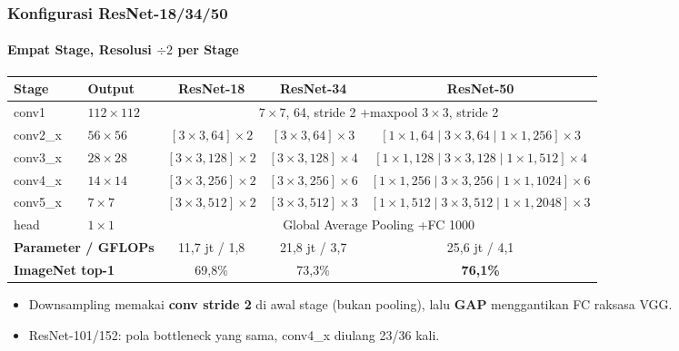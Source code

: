 \documentclass[t,aspectratio=169,xcolor=dvipsnames]{beamer}
\begin{document}
\begin{frame}
    \frametitle{Konfigurasi ResNet-18/34/50}
    \framesubtitle{Empat Stage, Resolusi $\div2$ per Stage}
    \scriptsize
    \vspace{4pt}
    \begin{center}
    \begin{tabular}{llccc}
        \toprule
        \textbf{Stage} & \textbf{Output} & \textbf{ResNet-18} & \textbf{ResNet-34} & \textbf{ResNet-50} \\
        \midrule
        conv1 & $112\times112$ & \multicolumn{3}{c}{$7\times7$, 64, stride 2 \quad+\quad maxpool $3\times3$, stride 2} \\
        conv2\_x & $56\times56$ & $[3\times3, 64]\times2$ & $[3\times3, 64]\times3$ & $[1{\times}1,64 \mid 3{\times}3,64 \mid 1{\times}1,256]\times3$ \\
        conv3\_x & $28\times28$ & $[3\times3, 128]\times2$ & $[3\times3, 128]\times4$ & $[1{\times}1,128 \mid 3{\times}3,128 \mid 1{\times}1,512]\times4$ \\
        conv4\_x & $14\times14$ & $[3\times3, 256]\times2$ & $[3\times3, 256]\times6$ & $[1{\times}1,256 \mid 3{\times}3,256 \mid 1{\times}1,1024]\times6$ \\
        conv5\_x & $7\times7$ & $[3\times3, 512]\times2$ & $[3\times3, 512]\times3$ & $[1{\times}1,512 \mid 3{\times}3,512 \mid 1{\times}1,2048]\times3$ \\
        head & $1\times1$ & \multicolumn{3}{c}{Global Average Pooling \quad+\quad FC 1000} \\
        \midrule
        \multicolumn{2}{l}{\textbf{Parameter / GFLOPs}} & 11,7 jt / 1,8 & 21,8 jt / 3,7 & 25,6 jt / 4,1 \\
        \multicolumn{2}{l}{\textbf{ImageNet top-1}} & 69,8\% & 73,3\% & \textbf{76,1\%} \\
        \bottomrule
    \end{tabular}
    \end{center}
    \vspace{0.15cm}
    \footnotesize
    \begin{itemize}
        \item Downsampling memakai \textbf{conv stride 2} di awal stage (bukan pooling), lalu \textbf{GAP} menggantikan FC raksasa VGG.
        \item ResNet-101/152: pola bottleneck yang sama, conv4\_x diulang 23/36 kali.
    \end{itemize}
\end{frame}
\end{document}
